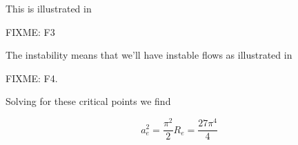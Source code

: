 This is illustrated in 

FIXME: F3

The instability means that we'll have instable flows as illustrated in 

FIXME: F4.

Solving for these critical points we find

\begin{subequations}
\begin{equation}\label{eqn:continuumL22:530}
a_e^2 = \frac{\pi^2}{2}
\end{equation}
\begin{equation}\label{eqn:continuumL22:550}
R_e = \frac{27 \pi^4}{4}
\end{equation}
\end{subequations}


\EndNoBibArticle
